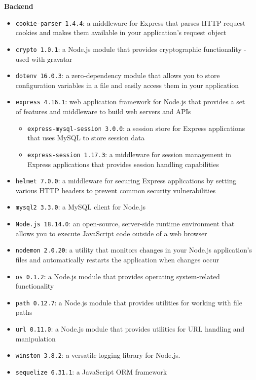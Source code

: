 \textbf{Backend}
\begin{itemize}
    \item \texttt{cookie-parser 1.4.4}: a middleware for Express that parses HTTP request cookies and makes them available in your application's request object
    \item \texttt{crypto 1.0.1}: a Node.js module that provides cryptographic functionality - used with gravatar
    \item \texttt{dotenv 16.0.3}: a zero-dependency module that allows you to store configuration variables in a file and easily access them in your application
    \item \texttt{express 4.16.1}: web application framework for Node.js that provides a set of features and middleware to build web servers and APIs
    \begin{itemize}
        \item \texttt{express-mysql-session 3.0.0}: a session store for Express applications that uses MySQL to store session data
        \item \texttt{express-session 1.17.3}: a middleware for session management in Express applications that provides session handling capabilities
    \end{itemize}
    \item \texttt{helmet 7.0.0}: a middleware for securing Express applications by setting various HTTP headers to prevent common security vulnerabilities
    \item \texttt{mysql2 3.3.0}: a MySQL client for Node.js
    \item \texttt{Node.js 18.14.0}: an open-source, server-side runtime environment that allows you to execute JavaScript code outside of a web browser
    \item \texttt{nodemon 2.0.20}: a utility that monitors changes in your Node.js application's files and automatically restarts the application when changes occur
    \item \texttt{os 0.1.2}: a Node.js module that provides operating system-related functionality 
    \item \texttt{path 0.12.7}: a Node.js module that provides utilities for working with file paths
    \item \texttt{url 0.11.0}: a Node.js module that provides utilities for URL handling and manipulation
    \item \texttt{winston 3.8.2}: a versatile logging library for Node.js.
    \item \texttt{sequelize 6.31.1}: a JavaScript ORM framework\\
    
\end{itemize}

